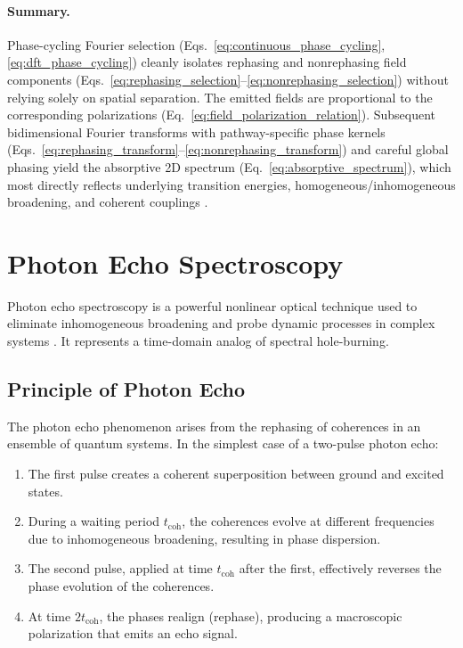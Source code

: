 \paragraph{Summary.}

\noindent 
Phase-cycling Fourier selection (Eqs.~\eqref{eq:continuous_phase_cycling}, \eqref{eq:dft_phase_cycling}) cleanly isolates rephasing and nonrephasing field components (Eqs.~\eqref{eq:rephasing_selection}--\eqref{eq:nonrephasing_selection}) without relying solely on spatial separation. The emitted fields are proportional to the corresponding polarizations (Eq.~\eqref{eq:field_polarization_relation}). Subsequent bidimensional Fourier transforms with pathway-specific phase kernels (Eqs.~\eqref{eq:rephasing_transform}--\eqref{eq:nonrephasing_transform}) and careful global phasing yield the absorptive 2D spectrum (Eq.~\eqref{eq:absorptive_spectrum}), which most directly reflects underlying transition energies, homogeneous/inhomogeneous broadening, and coherent couplings \cite{mukamel1995principlesnonlinearoptical, cho2009twodimensionalopticalspectroscopy, greenetal2024vibrationalcoherenceshalfbroadband}.


\section{Photon Echo Spectroscopy}
\label{sec:photon_echo}

\noindent 
Photon echo spectroscopy is a powerful nonlinear optical technique used to eliminate inhomogeneous broadening and probe dynamic processes in complex systems \cite{hybletal1998twodimensionalelectronicspectroscopy, mukamel1995principlesnonlinearoptical}. It represents a time-domain analog of spectral hole-burning.

\subsection{Principle of Photon Echo}
\label{subsec:echo_principle}

\noindent The photon echo phenomenon arises from the rephasing of coherences in an ensemble of quantum systems. In the simplest case of a two-pulse photon echo:

\begin{enumerate}
	\item The first pulse creates a coherent superposition between ground and excited states.
	\item During a waiting period $t_{\text{coh}}$, the coherences evolve at different frequencies due to inhomogeneous broadening, resulting in phase dispersion.
	\item The second pulse, applied at time $t_{\text{coh}}$ after the first, effectively reverses the phase evolution of the coherences.
	\item At time $2t_{\text{coh}}$, the phases realign (rephase), producing a macroscopic polarization that emits an echo signal.
\end{enumerate}

